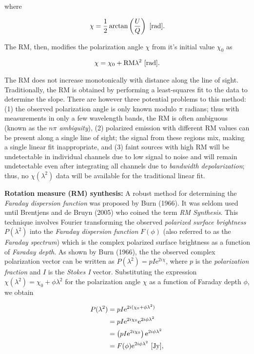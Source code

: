 \documentclass[a4paper,11pt]{article}
\begin{document}
{\noindent}where

\begin{align*}
    \chi = \frac{1}{2}\arctan\left(\frac{U}{Q}\right) ~ [{\rm rad}].
\end{align*}

{\noindent}The RM, then, modifies the polarization angle $\chi$ from it's initial value $\chi_0$ as 

\begin{align*}
    \chi = \chi_0 + \mathrm{RM}\lambda^2 ~ [{\rm rad}].
\end{align*}

{\noindent}The RM does not increase monotonically with distance along the line of sight. Traditionally, the RM is obtained by performing a least-squares fit to the data to determine the slope. There are however three potential problems to this method: (1) the observed polarization angle is only known modulo $\pi$ radians; thus with measurements in only a few wavelength bands, the RM is often ambiguous (known as the \textit{$n\pi$ ambiguity}), (2) polarized emission with different RM values can be present along a single line of sight; the signal from these regions mix, making a single linear fit inappropriate, and (3) faint sources with high RM will be undetectable in individual channels due to low signal to noise and will remain undetectable even after integrating all channels due to \textit{bandwidth depolarization}; thus, no $\chi(\lambda^2)$ data will be available for the traditional linear fit.

{\noindent}\textbf{Rotation measure (RM) synthesis:} A robust method for determining the \textit{Faraday dispersion function} was proposed by Burn (1966). It was seldom used until Brentjens and de Bruyn (2005) who coined the term \textit{RM Synthesis}. This technique involves Fourier transforming the observed \textit{polarized surface brightness} $P(\lambda^2)$ into the \textit{Faraday dispersion function} $F(\phi)$ (also referred to as the \textit{Faraday spectrum}) which is the complex polarized surface brightness as a function of \textit{Faraday depth}. As shown by Burn (1966), the the observed complex polarization vector can be written as $P(\lambda^2)=pI\mathrm{e}^{2i\chi}$, where $p$ is the \textit{polarization fraction} and $I$ is the \textit{Stokes I} vector. Substituting the expression $\chi(\lambda^2)=\chi_0+\phi\lambda^2$ for the polarization angle $\chi$ as a function of Faraday depth $\phi$, we obtain

\begin{align*}
    P(\lambda^2) &= pI\mathrm{e}^{2i(\chi_0+\phi\lambda^2)}\\
    &= pI\mathrm{e}^{2i\chi_0}\mathrm{e}^{2i\phi\lambda^2}\\
    &= \left(pI\mathrm{e}^{2i\chi_0}\right)\mathrm{e}^{2i\phi\lambda^2}\\
    &= F(\phi)\mathrm{e}^{2i\phi\lambda^2} ~ [{\rm Jy}],
\end{align*}
\end{document}
